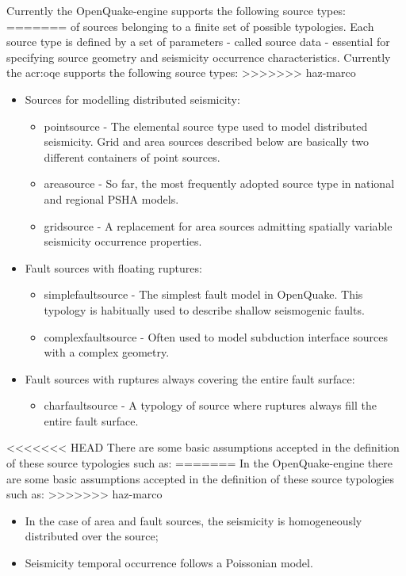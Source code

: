 Currently the OpenQuake-engine supports the following source types: 
=======
of sources belonging to a finite set of possible typologies. 
Each source type is defined by a set of parameters - called 
source data - essential for specifying source geometry and 
seismicity occurrence characteristics.
%
Currently the \gls{acr:oqe} supports the following source types: 
>>>>>>> haz-marco
\begin{itemize}
	\item Sources for modelling distributed seismicity:
	\begin{itemize}
		\item \Gls{pointsource} - The elemental source type used to model 
			distributed seismicity. Grid and area sources described below
			are basically two different containers of point sources.
		\item \Gls{areasource} - So far, the most frequently adopted source 
    		type in national and regional PSHA models.
		\item \Gls{gridsource} - A replacement for area sources admitting 
			spatially variable seismicity occurrence properties.
	\end{itemize}
	\item Fault sources with floating ruptures:
	\begin{itemize}
		\item \Gls{simplefaultsource} - The simplest fault model in OpenQuake. 
    		This typology is habitually used to describe shallow seismogenic 
    		faults.
		\item \Gls{complexfaultsource} - Often used to model subduction interface 
			sources with a complex geometry. 
	\end{itemize}
	\item Fault sources with ruptures always covering the entire fault surface:
	\begin{itemize}
		\item \Gls{charfaultsource} - A typology of source where ruptures
		always fill the entire fault surface.
	\end{itemize}
\end{itemize}
<<<<<<< HEAD
There are some basic assumptions accepted in the definition of these 
source typologies such as:
=======
In the OpenQuake-engine there are some basic assumptions accepted in the 
definition of these source typologies such as:
>>>>>>> haz-marco
\begin{itemize}
	\item In the case of area and fault sources, the seismicity is 
        homogeneously distributed over the source; 	
	\item Seismicity temporal occurrence follows a Poissonian model. 
\end{itemize}
